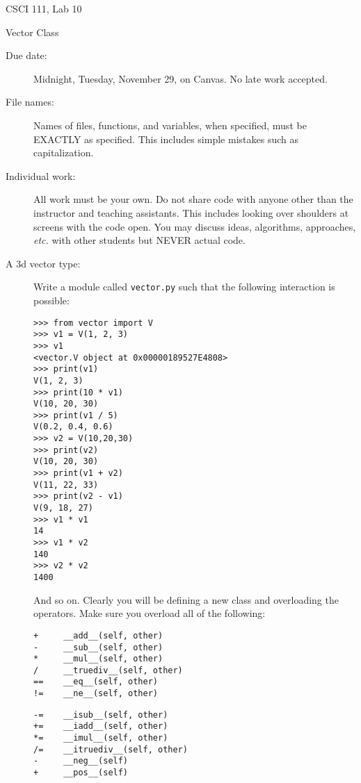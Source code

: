 \documentclass[12pt]{article}
\begin{document}
\sloppy
\centerline{\Large CSCI 111, Lab 10}
\centerline{\large Vector Class}


\begin{description}
\item[Due date:] Midnight, Tuesday, November 29, on Canvas.
No late work accepted.  

\item[File names:]  Names of files, functions, and variables, 
when specified,
must be EXACTLY as specified.  This includes simple mistakes such
as capitalization.

\item[Individual work:]  All work must be your own.  Do not share
code with anyone other than the instructor and teaching assistants.
This includes looking over shoulders at screens with the code open.
You may discuss ideas, algorithms, approaches, {\em etc.} with
other students but NEVER actual code.

\item[A 3d vector type:] Write a module called 
\lstinline{vector.py} such that the following
interaction is possible:

\begin{lstlisting}
>>> from vector import V
>>> v1 = V(1, 2, 3)
>>> v1
<vector.V object at 0x00000189527E4808>
>>> print(v1)
V(1, 2, 3)
>>> print(10 * v1)
V(10, 20, 30)
>>> print(v1 / 5)
V(0.2, 0.4, 0.6)
>>> v2 = V(10,20,30)
>>> print(v2)
V(10, 20, 30)
>>> print(v1 + v2)
V(11, 22, 33)
>>> print(v2 - v1)
V(9, 18, 27)
>>> v1 * v1
14
>>> v1 * v2
140
>>> v2 * v2
1400
\end{lstlisting}

And so on.  Clearly you will be defining a new
class and overloading
the operators.  Make sure you overload
all of the following:

\begin{minipage}{0.4\textwidth}
\begin{verbatim}
+     __add__(self, other)
-     __sub__(self, other)
*     __mul__(self, other)
/     __truediv__(self, other)
==    __eq__(self, other)
!=    __ne__(self, other)
\end{verbatim}
\end{minipage}\hfill
\begin{minipage}{0.4\textwidth}
\begin{verbatim}
-=    __isub__(self, other)
+=    __iadd__(self, other)
*=    __imul__(self, other)
/=    __itruediv__(self, other)
-     __neg__(self)
+     __pos__(self)
\end{verbatim}
\end{minipage}


\end{description}
\end{document}
